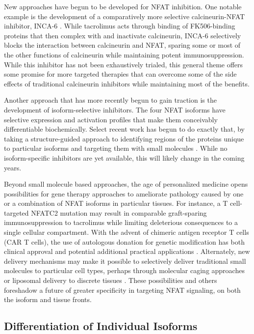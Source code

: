 New approaches have begun to be developed for NFAT inhibition. One notable example is the development of a comparatively more selective calcineurin\hyp{}NFAT inhibitor, INCA\hyp{}6 \citep{Roehrl2004a, Roehrl2004b}. While tacrolimus acts through binding of FK506\hyp{}binding proteins that then complex with and inactivate calcineurin, INCA\hyp{}6 selectively blocks the interaction between calcineurin and NFAT, sparing some or most of the other functions of calcineurin while maintaining potent immunosuppression. While this inhibitor has not been exhaustively trialed, this general theme offers some promise for more targeted therapies that can overcome some of the side effects of traditional calcineurin inhibitors while maintaining most of the benefits. 

Another approach that has more recently begun to gain traction is the development of isoform\hyp{}selective inhibitors. The four NFAT isoforms have selective expression and activation profiles that make them conceivably differentiable biochemically. Select recent work has begun to do exactly that, by taking a structure\hyp{}guided approach to identifying regions of the proteins unique to particular isoforms and targeting them with small molecules \citep{Kitamura2021}. While no isoform\hyp{}specific inhibitors are yet available, this will likely change in the coming years.

Beyond small molecule based approaches, the age of personalized medicine opens possibilities for gene therapy approaches to ameliorate pathology caused by one or a combination of NFAT isoforms in particular tissues. For instance, a T cell\hyp{}targeted NFATC2 mutation may result in comparable graft\hyp{}sparing immunosuppression to tacrolimus while limiting deleterious consequences to a single cellular compartment. With the advent of chimeric antigen receptor T cells (CAR T cells), the use of autologous donation for genetic modification has both clinical approval and potential additional practical applications \citep{June2007}. Alternately, new delivery mechanisms may make it possible to selectively deliver traditional small molecules to particular cell types, perhaps through molecular caging approaches or liposomal delivery to discrete tissues \citep{Mukhtar2020, Hu2019}. These possibilities and others foreshadow a future of greater specificity in targeting NFAT signaling, on both the isoform and tissue fronts. 

\subsection{Differentiation of Individual Isoforms}\label{diffnfat}

